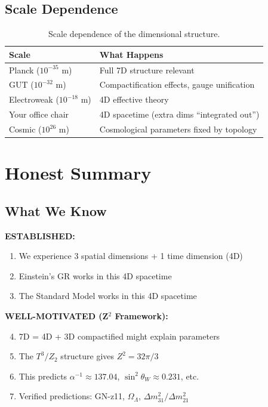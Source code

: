 \documentclass[12pt,a4paper]{article}
\begin{document}
\subsection{Scale Dependence}

\begin{table}[h]
\centering
\begin{tabular}{@{}ll@{}}
\toprule
Scale & What Happens \\
\midrule
Planck ($10^{-35}$ m) & Full 7D structure relevant \\
GUT ($10^{-32}$ m) & Compactification effects, gauge unification \\
Electroweak ($10^{-18}$ m) & 4D effective theory \\
Your office chair & 4D spacetime (extra dims ``integrated out'') \\
Cosmic ($10^{26}$ m) & Cosmological parameters fixed by topology \\
\bottomrule
\end{tabular}
\caption{Scale dependence of the dimensional structure.}
\end{table}

\section{Honest Summary}

\subsection{What We Know}

\textbf{ESTABLISHED:}
\begin{enumerate}
\item We experience 3 spatial dimensions + 1 time dimension (4D)
\item Einstein's GR works in this 4D spacetime
\item The Standard Model works in this 4D spacetime
\end{enumerate}

\textbf{WELL-MOTIVATED (Z$^2$ Framework):}
\begin{enumerate}
\setcounter{enumi}{3}
\item 7D = 4D + 3D compactified might explain parameters
\item The $T^3/Z_2$ structure gives $Z^2 = 32\pi/3$
\item This predicts $\alpha^{-1} \approx 137.04$, $\sin^2\theta_W \approx 0.231$, etc.
\item Verified predictions: GN-z11, $\Omega_\Lambda$, $\Delta m^2_{31}/\Delta m^2_{21}$
\end{enumerate}
\end{document}
